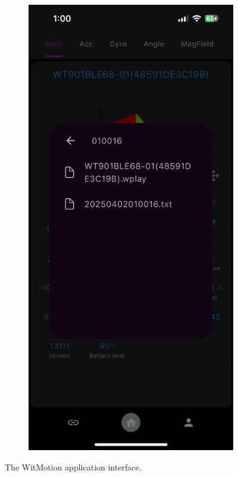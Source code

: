 \documentclass[12pt]{report}
\begin{document}
\begin{figure}[h]
\begin{subfigure}[b]{0.24\textwidth}
    \end{subfigure}
    \begin{subfigure}[b]{0.24\textwidth}
        \centering
        \includegraphics[width=\textwidth]{witmotion-app-interface-accelerometer-data-screen}
    \end{subfigure}
    \caption{The WitMotion application interface.}
\end{figure}
\end{document}
